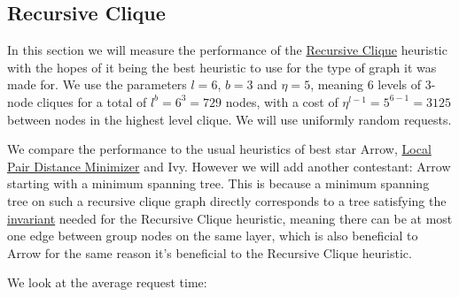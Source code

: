 \documentclass[a4paper, oneside]{discothesis}
\begin{document}
\subsection{Recursive Clique}

In this section we will measure the performance of the \hyperref[alg:reclique]{Recursive Clique} heuristic with the hopes of it being the best heuristic to use for the type of graph it was made for. We use the parameters $l=6$, $b=3$ and $\eta=5$, meaning 6 levels of 3-node cliques for a total of $l^b=6^3=729$ nodes, with a cost of $\eta^{l-1}=5^{6-1}=3125$ between nodes in the highest level clique. We will use uniformly random requests.

We compare the performance to the usual heuristics of best star Arrow, \hyperref[alg:lpm]{Local Pair Distance Minimizer} and Ivy. However we will add another contestant: Arrow starting with a minimum spanning tree. This is because a minimum spanning tree on such a recursive clique graph directly corresponds to a tree satisfying the \hyperref[reclique-invariant]{invariant} needed for the Recursive Clique heuristic, meaning there can be at most one edge between group nodes on the same layer, which is also beneficial to Arrow for the same reason it's beneficial to the Recursive Clique heuristic.

We look at the average request time:

\end{document}
